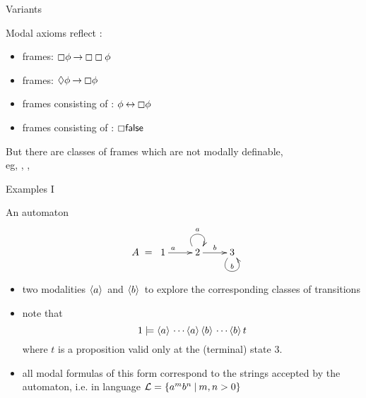 \documentclass{beamer}
\begin{document}
\begin{slide}{Variants}\label{s:39}
\small

Modal axioms reflect :
\vspace{0.4cm}

\begin{itemize}
\item
{} frames: $\boxempty \phi \mathbin{\rightarrow} \boxempty \boxempty \phi$
\item
{} frames: $\Diamond \phi \mathbin{\rightarrow} \boxempty  \phi$ 
\item frames consisting of : $ \phi \mathbin{\leftrightarrow} \boxempty  \phi$ 
\item frames consisting of : $\boxempty  \mathsf{false}$ 
\end{itemize}
\vspace{0.3cm}

But there are classes of frames which are not modally definable, \\
eg, , ,  
  
\end{slide}



\begin{slide}{Examples I}\label{s:15}
\small
\begin{block}{An automaton}
\begin{equation*}
\xymatrix{
A \; =\; \; 1 \ar[r]^{a} & 2 \ar@(ul,ur)[]^{a}  \ar[r]^{b} &3  \ar@(dl,dr)[]^{b} 
}
\end{equation*}
\begin{itemize}
\item two modalities $\pv{a}$ and $\pv{b}$ to explore the corresponding classes of transitions
\item note that
$$ 1 \models \langle a \rangle\, \cdots \langle a \rangle\, \langle b \rangle\, \cdots \langle b \rangle\, t$$
where $t$ is a proposition valid only at the (terminal) state $3$. 
\item all modal formulas of this form correspond to the strings accepted by the automaton, i.e. in language ${\cal L} = \mathopen{\{} a^mb^n \mathbin{|} m,n > 0 \mathclose{\}}$
\end{itemize}
\end{block}
\end{slide}
\end{document}
